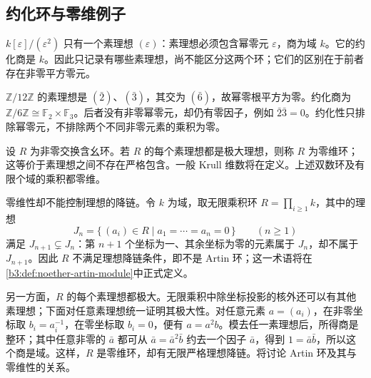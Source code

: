\subsection{约化环与零维例子}
\label{b3:subsec:0102:03}

\(k[\varepsilon]/(\varepsilon^2)\) 只有一个素理想 \((\varepsilon)\)：素理想必须包含幂零元 \(\varepsilon\)，商为域 \(k\)。它的约化商是 \(k\)。因此只记录有哪些素理想，尚不能区分这两个环；它们的区别在于前者存在非零平方零元。

\ProseParagraphBreak
\(\mathbb Z/12\mathbb Z\) 的素理想是 \((\bar2)\)、\((\bar3)\)，其交为 \((\bar6)\)，故幂零根平方为零。约化商为 \(\mathbb Z/6\mathbb Z\cong\mathbb F_2\times\mathbb F_3\)。后者没有非零幂零元，却仍有零因子，例如 \(\bar2\bar3=0\)。约化性只排除幂零元，不排除两个不同非零元素的乘积为零。

\ProseParagraphBreak
设 \(R\) 为非零交换含幺环。若 \(R\) 的每个素理想都是极大理想，则称 \(R\) 为零维环；这等价于素理想之间不存在严格包含。一般 Krull 维数将在定义。上述双数环及有限个域的乘积都零维。

\ProseParagraphBreak
零维性却不能控制理想的降链。令 \(k\) 为域，取无限乘积环 \(R=\prod_{i\ge1}k\)，其中的理想
\[
	J_n=\{\,(a_i)\in R\mid a_1=\cdots=a_n=0\,\} \qquad(n\ge1)
\]
满足 \(J_{n+1}\subsetneq J_n\)：第 \(n+1\) 个坐标为一、其余坐标为零的元素属于 \(J_n\)，却不属于 \(J_{n+1}\)。因此 \(R\) 不满足理想降链条件，即不是 Artin 环；这一术语将在\cref{b3:def:noether-artin-module}中正式定义。

\ProseParagraphBreak
另一方面，\(R\) 的每个素理想都极大。无限乘积中除坐标投影的核外还可以有其他素理想；下面对任意素理想统一证明其极大性。对任意元素 \(a=(a_i)\)，在非零坐标取 \(b_i=a_i^{-1}\)，在零坐标取 \(b_i=0\)，便有 \(a=a^2b\)。模去任一素理想后，所得商是整环；其中任意非零的 \(\bar a\) 都可从 \(\bar a=\bar a^2\bar b\) 约去一个因子 \(\bar a\)，得到 \(1=\bar a\bar b\)，所以这个商是域。这样，\(R\) 是零维环，却有无限严格理想降链。将讨论 Artin 环及其与零维性的关系。
